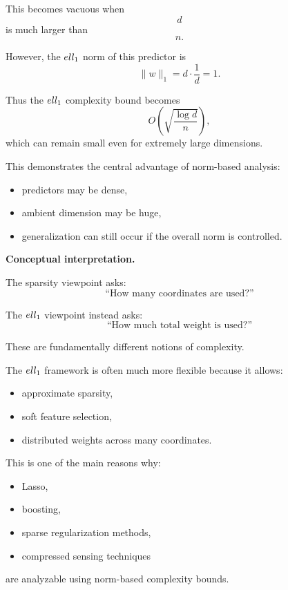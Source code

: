 \documentclass[11pt]{article}
\begin{document}
\begin{enumerate}
\begin{solutionbox}
This becomes vacuous when
\[
d
\]
is much larger than
\[
n.
\]

However, the $\\ell_1$ norm of this predictor is
\[
\|w\|_1
=
d\cdot\frac1d
=
1.
\]

Thus the $\\ell_1$ complexity bound becomes
\[
O\left(
\sqrt{
\frac{\log d}{n}
}
\right),
\]
which can remain small even for extremely large dimensions.

This demonstrates the central advantage of norm-based analysis:
\begin{itemize}
    \item predictors may be dense,
    \item ambient dimension may be huge,
    \item generalization can still occur if the overall norm is controlled.
\end{itemize}

\medskip

\textbf{Conceptual interpretation.}

The sparsity viewpoint asks:
\[
\text{``How many coordinates are used?''}
\]

The $\\ell_1$ viewpoint instead asks:
\[
\text{``How much total weight is used?''}
\]

These are fundamentally different notions of complexity.

The $\\ell_1$ framework is often much more flexible because it allows:
\begin{itemize}
    \item approximate sparsity,
    \item soft feature selection,
    \item distributed weights across many coordinates.
\end{itemize}

This is one of the main reasons why:
\begin{itemize}
    \item Lasso,
    \item boosting,
    \item sparse regularization methods,
    \item compressed sensing techniques
\end{itemize}
are analyzable using norm-based complexity bounds.

\end{solutionbox}

\end{enumerate}
\end{document}
